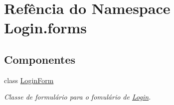 \hypertarget{namespaceLogin_1_1forms}{\section{Refência do Namespace Login.\-forms}
\label{d4/da4/namespaceLogin_1_1forms}
}
\subsection*{Componentes}
\begin{DoxyCompactItemize}
\item 
class \hyperlink{classLogin_1_1forms_1_1LoginForm}{Login\-Form}
\begin{DoxyCompactList}\small\item\em Classe de formulário para o fomulário de \hyperlink{namespaceLogin}{Login}. \end{DoxyCompactList}\end{DoxyCompactItemize}
